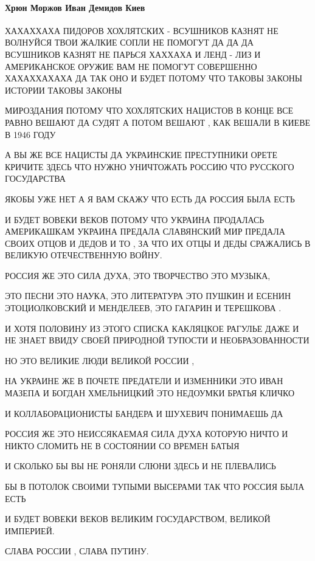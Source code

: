  
 
 
 
 

\paragraph{Хрюн Моржов Иван Демидов Киев}

ХАХАХХАХА ПИДОРОВ ХОХЛЯТСКИХ - ВСУШНИКОВ КАЗНЯТ НЕ ВОЛНУЙСЯ ТВОИ ЖАЛКИЕ СОПЛИ
НЕ ПОМОГУТ ДА ДА ДА ВСУШНИКОВ КАЗНЯТ НЕ ПАРЬСЯ ХАХХАХА И ЛЕНД - ЛИЗ И
АМЕРИКАНСКОЕ ОРУЖИЕ ВАМ НЕ ПОМОГУТ СОВЕРШЕННО ХАХАХХАХАХА ДА ТАК ОНО И БУДЕТ
ПОТОМУ ЧТО ТАКОВЫ ЗАКОНЫ ИСТОРИИ ТАКОВЫ ЗАКОНЫ

МИРОЗДАНИЯ ПОТОМУ ЧТО ХОХЛЯТСКИХ НАЦИСТОВ В КОНЦЕ ВСЕ РАВНО ВЕШАЮТ ДА СУДЯТ А
ПОТОМ ВЕШАЮТ , КАК ВЕШАЛИ В КИЕВЕ В 1946 ГОДУ

А ВЫ ЖЕ ВСЕ НАЦИСТЫ ДА УКРАИНСКИЕ ПРЕСТУПНИКИ ОРЕТЕ КРИЧИТЕ ЗДЕСЬ ЧТО НУЖНО
УНИЧТОЖАТЬ РОССИЮ ЧТО РУССКОГО ГОСУДАРСТВА

ЯКОБЫ УЖЕ НЕТ А Я ВАМ СКАЖУ ЧТО ЕСТЬ ДА РОССИЯ БЫЛА ЕСТЬ

И БУДЕТ ВОВЕКИ ВЕКОВ ПОТОМУ ЧТО УКРАИНА ПРОДАЛАСЬ АМЕРИКАШКАМ УКРАИНА ПРЕДАЛА
СЛАВЯНСКИЙ МИР ПРЕДАЛА СВОИХ ОТЦОВ И ДЕДОВ И ТО , ЗА ЧТО ИХ ОТЦЫ И ДЕДЫ
СРАЖАЛИСЬ В ВЕЛИКУЮ ОТЕЧЕСТВЕННУЮ ВОЙНУ.

РОССИЯ ЖЕ ЭТО СИЛА ДУХА, ЭТО ТВОРЧЕСТВО ЭТО МУЗЫКА,

ЭТО ПЕСНИ ЭТО НАУКА, ЭТО ЛИТЕРАТУРА ЭТО ПУШКИН И ЕСЕНИН ЭТОЦИОЛКОВСКИЙ И
МЕНДЕЛЕЕВ, ЭТО ГАГАРИН И ТЕРЕШКОВА .

И ХОТЯ ПОЛОВИНУ ИЗ ЭТОГО СПИСКА КАКЛЯЦКОЕ РАГУЛЬЕ ДАЖЕ И НЕ ЗНАЕТ ВВИДУ СВОЕЙ
ПРИРОДНОЙ ТУПОСТИ И НЕОБРАЗОВАННОСТИ

НО ЭТО ВЕЛИКИЕ ЛЮДИ ВЕЛИКОЙ РОССИИ ,

НА УКРАИНЕ ЖЕ В ПОЧЕТЕ ПРЕДАТЕЛИ И ИЗМЕННИКИ ЭТО ИВАН МАЗЕПА И БОГДАН
ХМЕЛЬНИЦКИЙ ЭТО НЕДОУМКИ БРАТЬЯ КЛИЧКО

И КОЛЛАБОРАЦИОНИСТЫ БАНДЕРА И ШУХЕВИЧ ПОНИМАЕШЬ ДА

РОССИЯ ЖЕ ЭТО НЕИССЯКАЕМАЯ СИЛА ДУХА КОТОРУЮ НИЧТО И НИКТО СЛОМИТЬ НЕ В
СОСТОЯНИИ СО ВРЕМЕН БАТЫЯ

И СКОЛЬКО БЫ ВЫ НЕ РОНЯЛИ СЛЮНИ ЗДЕСЬ И НЕ ПЛЕВАЛИСЬ

БЫ В ПОТОЛОК СВОИМИ ТУПЫМИ ВЫСЕРАМИ ТАК ЧТО РОССИЯ БЫЛА ЕСТЬ

И БУДЕТ ВОВЕКИ ВЕКОВ ВЕЛИКИМ ГОСУДАРСТВОМ, ВЕЛИКОЙ ИМПЕРИЕЙ.

СЛАВА РОССИИ , СЛАВА ПУТИНУ.
